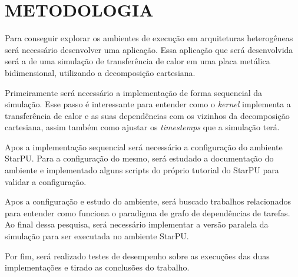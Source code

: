 
\chapter{METODOLOGIA}
\label{chap:metodologia}

Para conseguir explorar os ambientes de execução em arquiteturas heterogêneas será necessário desenvolver uma aplicação.
Essa aplicação que será desenvolvida será a de uma simulação de transferência de calor em uma placa metálica bidimensional,
utilizando a decomposição cartesiana.

Primeiramente será necessário a implementação de forma sequencial da simulação.
Esse passo é interessante para entender como o \textit{kernel} implementa a transferência de calor e as suas dependências com os vizinhos
da decomposição cartesiana, assim também como ajustar os \textit{timestemps} que a simulação terá.

Apos a implementação sequencial será necessário a configuração do ambiente StarPU.
Para a configuração do mesmo, será estudado a documentação do ambiente e implementado alguns scripts do próprio tutorial do StarPU
para validar a configuração.

Apos a configuração e estudo do ambiente, será buscado trabalhos relacionados para entender como funciona o paradigma de grafo de dependências de tarefas.
Ao final dessa pesquisa, será necessário implementar a versão paralela da simulação para ser executada no ambiente StarPU.

Por fim, será realizado testes de desempenho sobre as execuções das duas implementações e tirado as conclusões do trabalho.